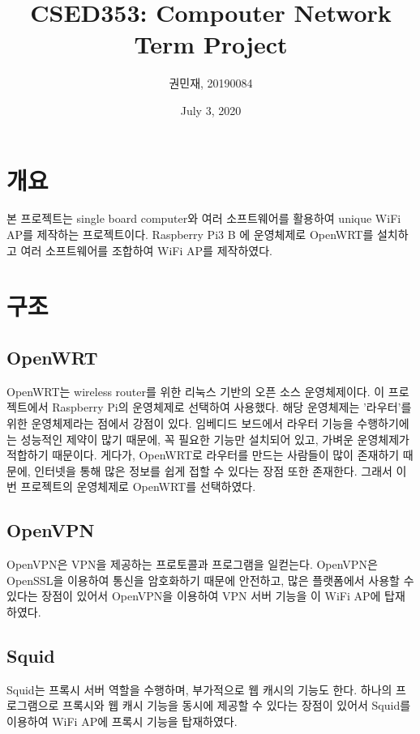 \documentclass{article}
\begin{document}
    \author{\large 권민재, 20190084}
    \title{\Large\textbf{CSED353: Compouter Network Term Project}}
    \date{\small July 3, 2020}
    \maketitle
    \newpage

    \tableofcontents

    \newpage
    \section{개요}
     본 프로젝트는 single board computer와 여러 소프트웨어를 활용하여 unique WiFi AP를 제작하는 프로젝트이다.
     Raspberry Pi3 B 에 운영체제로 OpenWRT를 설치하고 여러 소프트웨어를 조합하여 WiFi AP를 제작하였다.

    \section{구조}
    \subsection{OpenWRT}
     OpenWRT는 wireless router를 위한 리눅스 기반의 오픈 소스 운영체제이다. 이 프로젝트에서 Raspberry Pi의 운영체제로 선택하여 사용했다.
     해당 운영체제는 '라우터'를 위한 운영체제라는 점에서 강점이 있다. 임베디드 보드에서 라우터 기능을 수행하기에는 성능적인 제약이 많기 때문에,
    꼭 필요한 기능만 설치되어 있고, 가벼운 운영체제가 적합하기 때문이다. 게다가, OpenWRT로 라우터를 만드는 사람들이 많이 존재하기 때문에,
     인터넷을 통해 많은 정보를 쉽게 접할 수 있다는 장점 또한 존재한다. 그래서 이번 프로젝트의 운영체제로 OpenWRT를 선택하였다.
    \subsection{OpenVPN}
     OpenVPN은 VPN을 제공하는 프로토콜과 프로그램을 일컫는다. OpenVPN은 OpenSSL을 이용하여 통신을 암호화하기 때문에 안전하고, 많은 플랫폼에서 사용할 수 있다는 장점이 있어서
     OpenVPN을 이용하여 VPN 서버 기능을 이 WiFi AP에 탑재하였다.
    \subsection{Squid}
     Squid는 프록시 서버 역할을 수행하며, 부가적으로 웹 캐시의 기능도 한다.
     하나의 프로그램으로 프록시와 웹 캐시 기능을 동시에 제공할 수 있다는 장점이 있어서 Squid를 이용하여 WiFi AP에 프록시 기능을 탑재하였다.
\end{document}
